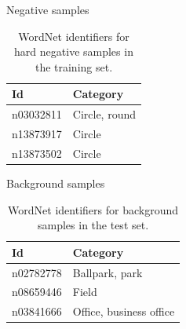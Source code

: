 \documentclass{beamer}
\begin{document}
\begin{frame}{Negative samples}
	\begin{table}[H]
		\centering
		\caption{WordNet identifiers for hard negative samples in the training set.}
		\label{tab:negtraining}
		\begin{tabularx}{\textwidth}{lX}
			\toprule
			\textbf{Id} & \textbf{Category} \\
			\midrule
				n03032811 & Circle, round \\
				n13873917 & Circle \\
				n13873502 & Circle \\
			\bottomrule
		\end{tabularx}
	\end{table}
\end{frame}

\begin{frame}{Background samples}
	\begin{table}[H]
		\centering
		\caption{WordNet identifiers for background samples in the test set.}
		\label{tab:baktraining}
		\begin{tabularx}{\textwidth}{lX}
			\toprule
			\textbf{Id} & \textbf{Category} \\
			\midrule
				n02782778 & Ballpark, park \\
				n08659446 & Field \\
				n03841666 & Office, business office \\
			\bottomrule
		\end{tabularx}
	\end{table}
\end{frame}
\end{document}
